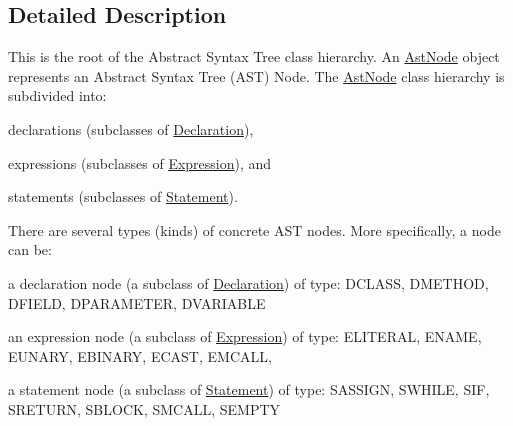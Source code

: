 \subsection{Detailed Description}
This is the root of the Abstract Syntax Tree class hierarchy. An \hyperlink{classAstNode}{AstNode} object represents an Abstract Syntax Tree (AST) Node. The \hyperlink{classAstNode}{AstNode} class hierarchy is subdivided into:
\begin{DoxyItemize}
\item declarations (subclasses of \hyperlink{classDeclaration}{Declaration}),
\item expressions (subclasses of \hyperlink{classExpression}{Expression}), and
\item statements (subclasses of \hyperlink{classStatement}{Statement}).
\end{DoxyItemize}

There are several types (kinds) of concrete AST nodes. More specifically, a node can be:
\begin{DoxyItemize}
\item a declaration node (a subclass of \hyperlink{classDeclaration}{Declaration}) of type: DCLASS, DMETHOD, DFIELD, DPARAMETER, DVARIABLE
\item an expression node (a subclass of \hyperlink{classExpression}{Expression}) of type: ELITERAL, ENAME, EUNARY, EBINARY, ECAST, EMCALL,
\item a statement node (a subclass of \hyperlink{classStatement}{Statement}) of type: SASSIGN, SWHILE, SIF, SRETURN, SBLOCK, SMCALL, SEMPTY 
\end{DoxyItemize}

